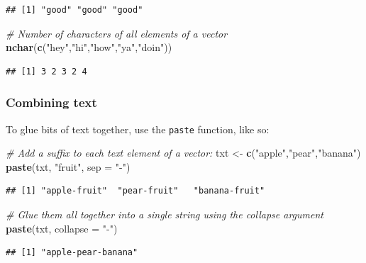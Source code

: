 \documentclass[]{book}
\newenvironment{Shaded}{\begin{snugshade}}{\end{snugshade}}
\newcommand{\CommentTok}[1]{\textcolor[rgb]{0.56,0.35,0.01}{\textit{#1}}}
\newcommand{\DataTypeTok}[1]{\textcolor[rgb]{0.13,0.29,0.53}{#1}}
\newcommand{\KeywordTok}[1]{\textcolor[rgb]{0.13,0.29,0.53}{\textbf{#1}}}
\newcommand{\NormalTok}[1]{#1}
\newcommand{\StringTok}[1]{\textcolor[rgb]{0.31,0.60,0.02}{#1}}
\begin{document}
\begin{verbatim}
## [1] "good" "good" "good"
\end{verbatim}

\begin{Shaded}
\begin{Highlighting}[]
\CommentTok{# Number of characters of all elements of a vector}
\KeywordTok{nchar}\NormalTok{(}\KeywordTok{c}\NormalTok{(}\StringTok{"hey"}\NormalTok{,}\StringTok{"hi"}\NormalTok{,}\StringTok{"how"}\NormalTok{,}\StringTok{"ya"}\NormalTok{,}\StringTok{"doin"}\NormalTok{))}
\end{Highlighting}
\end{Shaded}

\begin{verbatim}
## [1] 3 2 3 2 4
\end{verbatim}

\hypertarget{paste}{%
\subsubsection{Combining text}\label{paste}}

To glue bits of text together, use the \texttt{paste} function, like so:

\begin{Shaded}
\begin{Highlighting}[]
\CommentTok{# Add a suffix to each text element of a vector:}
\NormalTok{txt <-}\StringTok{ }\KeywordTok{c}\NormalTok{(}\StringTok{"apple"}\NormalTok{,}\StringTok{"pear"}\NormalTok{,}\StringTok{"banana"}\NormalTok{)}
\KeywordTok{paste}\NormalTok{(txt, }\StringTok{"fruit"}\NormalTok{, }\DataTypeTok{sep =} \StringTok{"-"}\NormalTok{)}
\end{Highlighting}
\end{Shaded}

\begin{verbatim}
## [1] "apple-fruit"  "pear-fruit"   "banana-fruit"
\end{verbatim}

\begin{Shaded}
\begin{Highlighting}[]
\CommentTok{# Glue them all together into a single string using the collapse argument}
\KeywordTok{paste}\NormalTok{(txt, }\DataTypeTok{collapse =} \StringTok{"-"}\NormalTok{)}
\end{Highlighting}
\end{Shaded}

\begin{verbatim}
## [1] "apple-pear-banana"
\end{verbatim}
\end{document}
